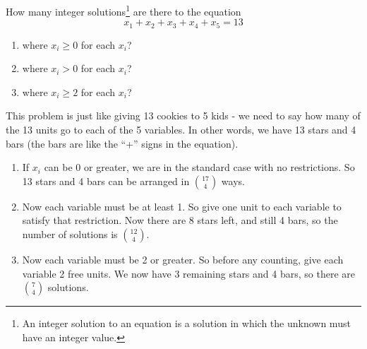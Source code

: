\documentclass[12pt]{article}
\begin{document}
\begin{example}
  How many integer solutions\footnote{An integer solution to an equation is a solution in which the unknown must have an integer value.} are there to the equation
  \[x_1 + x_2 + x_3 + x_4 + x_5 = 13\]
  \begin{enumerate}
    \item where $x_i \ge 0$ for each $x_i$?
    \item where $x_i > 0$ for each $x_i$?
    \item where $x_i \ge 2$ for each $x_i$?

  \end{enumerate}
  \begin{solution}
  This problem is just like giving 13 cookies to 5 kids - we need to say how many of the 13 units go to each of the 5 variables.  In other words, we have 13 stars and 4 bars (the bars are like the ``+'' signs in the equation).
      \begin{enumerate}
    \item If $x_i$ can be 0 or greater, we are in the standard case with no restrictions.  So 13 stars and 4 bars can be arranged in ${17 \choose 4}$ ways.
    \item Now each variable must be at least 1.  So give one unit to each variable to satisfy that restriction.  Now there are 8 stars left, and still 4 bars, so the number of solutions is ${12 \choose 4}$.
    \item Now each variable must be 2 or greater.  So before any counting, give each variable 2 free units.  We now have 3 remaining stars and 4 bars, so there are ${7 \choose 4}$ solutions.
      
  \end{enumerate}
  \end{solution}

\end{example}
\end{document}
